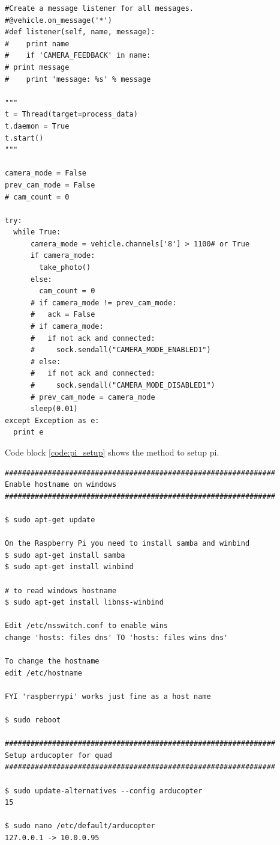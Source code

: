\begin{appendices}
\begin{lstlisting}
#Create a message listener for all messages.
#@vehicle.on_message('*')
#def listener(self, name, message):
#    print name
#    if 'CAMERA_FEEDBACK' in name:
# print message
#    print 'message: %s' % message

"""
t = Thread(target=process_data)
t.daemon = True
t.start()
"""

camera_mode = False
prev_cam_mode = False
# cam_count = 0

try:
  while True:
      camera_mode = vehicle.channels['8'] > 1100# or True
      if camera_mode:
        take_photo()
      else:
        cam_count = 0
      # if camera_mode != prev_cam_mode:
      #   ack = False
      # if camera_mode:
      #   if not ack and connected:
      #     sock.sendall("CAMERA_MODE_ENABLED1")
      # else:
      #   if not ack and connected:
      #     sock.sendall("CAMERA_MODE_DISABLED1")
      # prev_cam_mode = camera_mode
      sleep(0.01)
except Exception as e:
  print e

\end{lstlisting}

Code block \ref{code:pi_setup} shows the method to setup pi.

\begin{lstlisting}
###############################################################
Enable hostname on windows
###############################################################

$ sudo apt-get update

On the Raspberry Pi you need to install samba and winbind
$ sudo apt-get install samba
$ sudo apt-get install winbind

# to read windows hostname
$ sudo apt-get install libnss-winbind

Edit /etc/nsswitch.conf to enable wins
change 'hosts: files dns' TO 'hosts: files wins dns'

To change the hostname
edit /etc/hostname

FYI 'raspberrypi' works just fine as a host name

$ sudo reboot

###############################################################
Setup arducopter for quad
###############################################################

$ sudo update-alternatives --config arducopter
15

$ sudo nano /etc/default/arducopter 
127.0.0.1 -> 10.0.0.95


\end{lstlisting}
\end{appendices}

